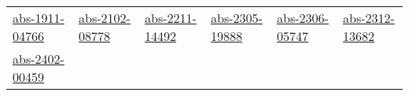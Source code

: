 \begin{longtable}{*{6}{l}}
\href{../works/abs-1911-04766.pdf}{abs-1911-04766}~\cite{abs-1911-04766} & \href{../works/abs-2102-08778.pdf}{abs-2102-08778}~\cite{abs-2102-08778} & \href{../works/abs-2211-14492.pdf}{abs-2211-14492}~\cite{abs-2211-14492} & \href{../works/abs-2305-19888.pdf}{abs-2305-19888}~\cite{abs-2305-19888} & \href{../works/abs-2306-05747.pdf}{abs-2306-05747}~\cite{abs-2306-05747} & \href{../works/abs-2312-13682.pdf}{abs-2312-13682}~\cite{abs-2312-13682}\\ 
\href{../works/abs-2402-00459.pdf}{abs-2402-00459}~\cite{abs-2402-00459} & \end{longtable}
